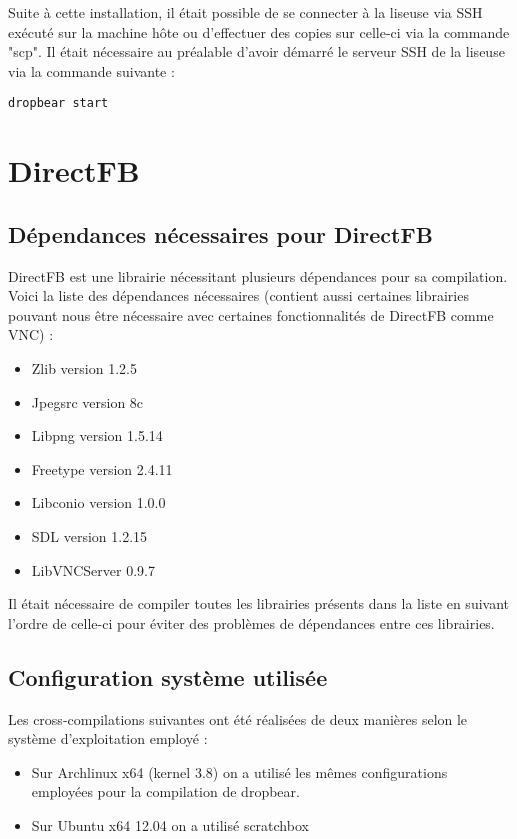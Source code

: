 Suite à cette installation, il était possible de se connecter à la liseuse via SSH exécuté sur la machine hôte ou d'effectuer des copies sur celle-ci via la commande "scp". Il était nécessaire au préalable d'avoir démarré le serveur SSH de la liseuse via la commande suivante :

\begin{lstlisting}
dropbear start
\end{lstlisting}

\newpage


\section{DirectFB}

\subsection{Dépendances nécessaires pour DirectFB}

DirectFB est une librairie nécessitant plusieurs dépendances pour sa compilation. Voici la liste des dépendances nécessaires (contient aussi certaines librairies pouvant nous être nécessaire avec certaines fonctionnalités de DirectFB comme VNC) :

\begin{itemize}
\item Zlib version 1.2.5
\item Jpegsrc version 8c
\item Libpng version 1.5.14
\item Freetype version 2.4.11
\item Libconio version 1.0.0
\item SDL version 1.2.15
\item LibVNCServer 0.9.7
\end{itemize}

Il était nécessaire de compiler toutes les librairies présents dans la liste en suivant l'ordre de celle-ci pour éviter des problèmes de dépendances entre ces librairies.

\subsection{Configuration système utilisée}
Les cross-compilations suivantes ont été réalisées de deux manières selon le système d'exploitation employé : 

\begin{itemize}
\item Sur Archlinux x64 (kernel 3.8) on a utilisé les mêmes configurations employées pour la compilation de dropbear.
\item Sur Ubuntu x64 12.04 on a utilisé scratchbox %
\end{itemize}

